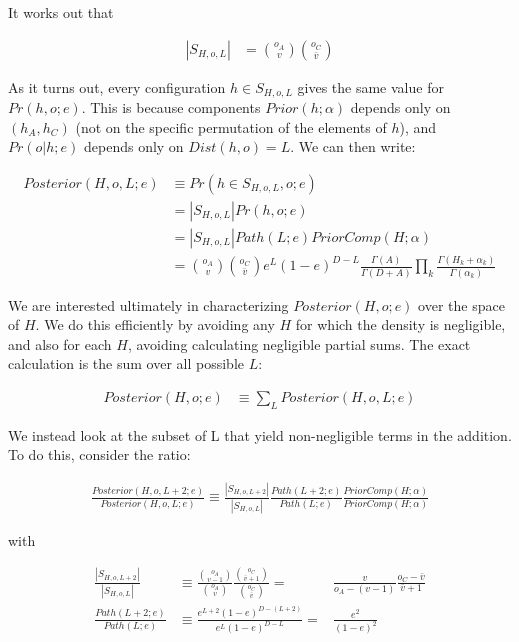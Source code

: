 \documentclass{article}
\begin{document}
It works out that

\begin{align}
  |S_{H,o,L}| & = {o_A \choose v} {o_C \choose \bar{v}}
\end{align}

As it turns out, every configuration $h \in S_{H,o,L}$ gives the same
value for $Pr(h, o; e)$.  This is because components $Prior(h;\alpha)$
depends only on $(h_A,h_C)$ (not on the specific permutation of the
elements of $h$), and $Pr(o|h;e)$ depends only on $Dist(h,o) = L$. We
can then write:

\begin{align}
  Posterior(H,o,L;e) & \equiv Pr(h \in S_{H,o,L},o;e) \nonumber \\[2ex]
  & = |S_{H,o,L}| Pr(h,o;e) \nonumber \\[2ex]
  & = |S_{H,o,L}| Path(L;e) PriorComp(H;\alpha) \nonumber \\[2ex]
  & = {o_A \choose v}{o_C \choose \bar{v}}
  e^L(1-e)^{D-L}
  \frac{\Gamma(A)}{\Gamma(D+A)}
  \prod_k \frac{\Gamma(H_k+\alpha_k)}{\Gamma(\alpha_k)}
\end{align}


We are interested ultimately in characterizing $Posterior(H,o;e)$ over
the space of $H$.  We do this efficiently by avoiding any $H$ for
which the density is negligible, and also for each $H$, avoiding
calculating negligible partial sums. The exact calculation is the sum
over all possible $L$:

\begin{align}
  Posterior(H,o;e) & \equiv \sum_L Posterior(H,o,L;e) \nonumber
\end{align}

We instead look at the subset of L that yield non-negligible terms in
the addition. To do this, consider the ratio:

\begin{align}
  \frac{Posterior(H,o,L+2;e)}{Posterior(H,o,L;e)} \equiv
  \frac{|S_{H,o,L+2}|}{|S_{H,o,L}|}
  \frac{Path(L+2;e)}{Path(L;e)}
  \frac{PriorComp(H;\alpha)}{PriorComp(H;\alpha)}
\end{align}

with

\begin{align}
  \frac{|S_{H,o,L+2}|}{|S_{H,o,L}|}
  & \equiv
  \frac{{o_A \choose {v-1}}}{{o_A \choose v}}
  \frac{{o_C \choose {\bar{v}+1}}}{{o_C \choose {\bar{v}}}}
  = &
  \frac{v}{o_A-(v-1)}
  \frac{o_C - \bar{v}}{\bar{v} + 1} \\[4ex]
  \frac{Path(L+2;e)}{Path(L;e)}
  & \equiv
  \frac{e^{L+2}(1-e)^{D-(L+2)}}{e^L(1-e)^{D-L}}
  = &
  \frac{e^2}{(1-e)^2}
\end{align}
\end{document}
